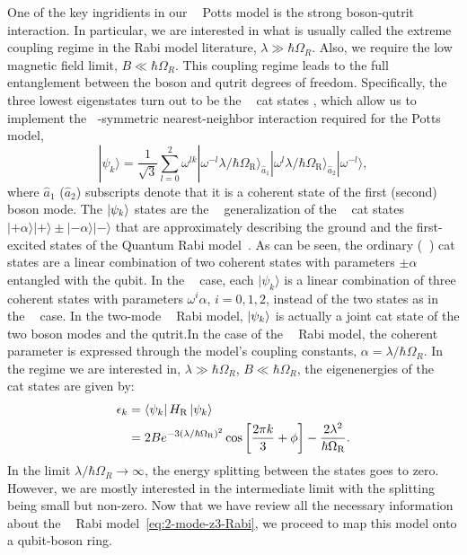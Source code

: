 \documentclass[reprint, aps, prx, amsmath, amssymb, longbibliography, superscriptaddress]{revtex4-2}
\DeclareMathOperator{\Zthree}{\mathbb{Z}_3}
\DeclareMathOperator{\Ztwo}{\mathbb{Z}_2}
\begin{document}
One of the key ingridients in our $\Zthree$ Potts model is the strong boson-qutrit interaction. In particular, we are interested in what is usually called the extreme coupling regime in the Rabi model literature, $\lambda \gg \hbar \Omega_R$. Also, we require the low magnetic field limit, $ B \ll \hbar \Omega_R$. This coupling regime leads to the full entanglement between the boson and qutrit degrees of freedom. Specifically, the three lowest eigenstates turn out to be the $\Zthree$ cat states \cite{lotkov_cat_2025b}, which allow us to implement the $\Zthree$-symmetric nearest-neighbor interaction required for the Potts model,
\begin{equation}
\label{eq:three-cat-states}
    |\psi_k\rangle = \frac{1}{\sqrt{3}}\sum\limits_{l=0}^2 \omega^{lk}|\omega^{-l} \lambda/\hbar \Omega_{\text{R}}\rangle_{\hat a_1}|\omega^l \lambda/\hbar \Omega_{\text{R}}\rangle_{\hat a_2} |\omega^{-l} \rangle,
\end{equation}
where $\hat a_1$ ($\hat a_2$) subscripts denote that it is a coherent state of the first (second) boson mode.  The $\ket{\psi_k}$ states are the $\Zthree$ generalization of the $\Ztwo$ cat states $|+\alpha\rangle|+\rangle\pm|-\alpha\rangle|-\rangle$ that are approximately describing the ground and the first-excited states of the Quantum Rabi model~\cite{hwang_quantum_2015}. As can be seen, the ordinary ($\Ztwo$) cat states are a linear combination of two coherent states with parameters $\pm\alpha$ entangled with the qubit. In the $\Zthree$ case, each $|\psi_k\rangle$ is a linear combination of three coherent states with parameters $\omega^i \alpha, \, i = 0,1,2$, instead of the two states as in the $\Ztwo$ case. In the two-mode $\Zthree$ Rabi model, $\ket{\psi_k}$ is actually a joint cat state of the two boson modes and the qutrit.In the case of the $\Zthree$ Rabi model, the coherent parameter is expressed through the model's coupling constants, $\alpha = \lambda/\hbar \Omega_R$. In the regime we are interested in, $\lambda \gg \hbar \Omega_R$, $ B \ll \hbar \Omega_R$, the eigenenergies of the $\Zthree$ cat states are given by:
\begin{equation}
\begin{aligned}
\label{eq:rabi-spectrum}
    \epsilon_k &= \bra{\psi_k}H_{\text{R}} \ket{\psi_k} \\
    &= 2 B e^{-3(\lambda/\hbar \Omega_{\text{R}})^2}\cos\left[\frac{2\pi k}{3} + \phi\right] - \frac{2\lambda^2}{\hbar \Omega_{\text{R}}}.
\end{aligned}
\end{equation}
In the limit $\lambda/\hbar \Omega_R \to \infty$, the energy splitting between the states goes to zero. However, we are mostly interested in the intermediate limit with the splitting being small but non-zero. Now that we have review all the necessary information about the $\Zthree$ Rabi model~\eqref{eq:2-mode-z3-Rabi}, we proceed to  map this model onto a qubit-boson ring.
\end{document}

